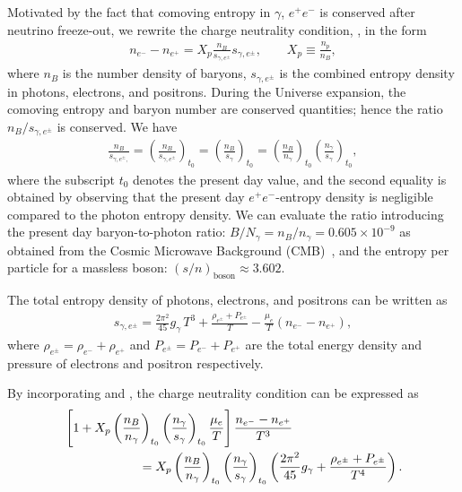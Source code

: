 Motivated by the fact that comoving entropy in $\gamma$, $e^+e^-$ is conserved after neutrino freeze-out, we rewrite the charge neutrality condition, , in the form
\begin{align}\label{charge_neutral_cond2}
n_{e^-}-n_{{e^+}}=X_p\frac{n_B}{s_{\gamma,e^\pm}} s_{\gamma,e^\pm},\qquad X_p\equiv\frac{n_p}{n_B},
\end{align}
where $n_B$ is the number density of baryons, $s_{\gamma,e^\pm}$ is the combined entropy density in photons, electrons, and positrons. During the Universe expansion, the comoving entropy and baryon number are conserved quantities; hence the ratio $n_B/s_{\gamma,e^\pm}$ is conserved. We have
\begin{align}
\frac{n_B}{s_{\gamma,e^\pm,}}=\left(\frac{n_B}{s_{\gamma,e^\pm}}\right)_{t_0}\!\!\!\!=\left(\frac{n_B}{s_{\gamma}}\right)_{t_0}\!\!\!\!=\left(\frac{n_B}{n_\gamma}\right)_{t_0}\left(\frac{n_\gamma}{s_{\gamma}}\right)_{t_0},
\end{align}
where the subscript $t_0$ denotes the present day value, and the second equality is obtained by observing that the present day $e^+e^-$-entropy density is negligible compared to the photon entropy density. We can evaluate the ratio introducing the present day baryon-to-photon ratio: $B/N_\gamma =n_B/n_\gamma= 0.605\times10^{-9}$ as obtained from the Cosmic Microwave Background (CMB)~\cite{ParticleDataGroup:2022pth}, and the entropy per particle for a massless boson: $(s/n)_{\mathrm{boson}}\approx 3.602$.

The total entropy density of photons, electrons, and positrons can be written as
\begin{align}\label{entropy_per_baryon}
s_{\gamma,e^\pm}=\frac{2\pi^2}{45}g_\gamma\,T^3+\frac{\rho_{e^\pm}+P_{e^\pm}}{T}-\frac{\mu_e}{T}(n_{e^-}-n_{{e^+}}),
 \end{align}
where $ \rho_{e^\pm}=\rho_{e^-}+\rho_{e^+}$ and $P_{e^\pm}=P_{e^-}+P_{{e^+}}$ are the total energy density and pressure of electrons and positron respectively.

By incorporating  and , the charge neutrality condition can be expressed as
\begin{align}\label{charge_neutral_cond3}
 &\left[1+X_p\left(\frac{n_B}{n_\gamma}\right)_{t_0}\left(\frac{n_\gamma}{s_{\gamma}}\right)_{t_0}\frac{\mu_e}{T}\right]\frac{n_{e^-}-n_{{e^+}}}{T^3}\notag\\
 &\qquad\qquad\qquad=X_p\left(\frac{n_B}{n_\gamma}\right)_{t_0}\left(\frac{n_\gamma}{s_{\gamma}}\right)_{t_0} \left(\frac{2\pi^2}{45}g_\gamma+\frac{\rho_{e^\pm}+P_{e^\pm}}{T^4}\right).
\end{align}

